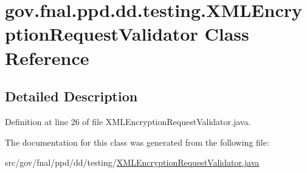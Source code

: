 \hypertarget{classgov_1_1fnal_1_1ppd_1_1dd_1_1testing_1_1XMLEncryptionRequestValidator}{\section{gov.\-fnal.\-ppd.\-dd.\-testing.\-X\-M\-L\-Encryption\-Request\-Validator Class Reference}
\label{classgov_1_1fnal_1_1ppd_1_1dd_1_1testing_1_1XMLEncryptionRequestValidator}
}


\subsection{Detailed Description}


Definition at line 26 of file X\-M\-L\-Encryption\-Request\-Validator.\-java.



The documentation for this class was generated from the following file\-:\begin{DoxyCompactItemize}
\item 
src/gov/fnal/ppd/dd/testing/\hyperlink{XMLEncryptionRequestValidator_8java}{X\-M\-L\-Encryption\-Request\-Validator.\-java}\end{DoxyCompactItemize}
